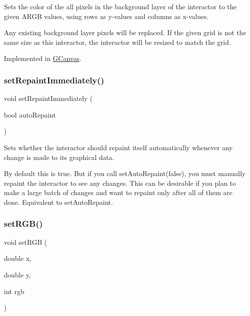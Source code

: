 Sets the color of the all pixels in the background layer of the interactor to the given A\+R\+GB values, using rows as y-\/values and columns as x-\/values. 

Any existing background layer pixels will be replaced. If the given grid is not the same size as this interactor, the interactor will be resized to match the grid. 

Implemented in \mbox{\hyperlink{classGCanvas_a6573789f75baf0b21122763e9a87c8df}{G\+Canvas}}.

\mbox{\label{classGDrawingSurface_abf5590a3992dcb7896ed449e65961da3}} 
\subsubsection{\texorpdfstring{set\+Repaint\+Immediately()}{setRepaintImmediately()}}
{\footnotesize\ttfamily void set\+Repaint\+Immediately (\begin{DoxyParamCaption}\item[{bool}]{auto\+Repaint }\end{DoxyParamCaption})\hspace{0.3cm}{\ttfamily [virtual]}}



Sets whether the interactor should repaint itself automatically whenever any change is made to its graphical data. 

By default this is true. But if you call set\+Auto\+Repaint(false), you must manually repaint the interactor to see any changes. This can be desirable if you plan to make a large batch of changes and want to repaint only after all of them are done. Equivalent to set\+Auto\+Repaint. \mbox{\label{classGDrawingSurface_a8bcbd65fa784bdab1e66a9efd381162d}} 
\subsubsection{\texorpdfstring{set\+R\+G\+B()}{setRGB()}\hspace{0.1cm}{\footnotesize\ttfamily [1/3]}}
{\footnotesize\ttfamily void set\+R\+GB (\begin{DoxyParamCaption}\item[{double}]{x,  }\item[{double}]{y,  }\item[{int}]{rgb }\end{DoxyParamCaption})\hspace{0.3cm}{\ttfamily [virtual]}}




